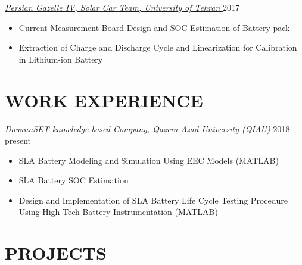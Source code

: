 \documentclass[10pt,a4paper,sans]{moderncv} %
\begin{document}
		\vspace{0.5em}
		
		\href{https://pgsc.ut.ac.ir/en/}{ \emph{Persian Gazelle IV, Solar Car Team, University of Tehran }} \hfill 2017
    	\begin{itemize}[nosep, leftmargin=0.9cm ]
    	    \item Current Measurement Board Design and SOC Estimation of Battery pack
    	    \item Extraction of Charge and Discharge Cycle and Linearization for Calibration in Lithium-ion Battery
    	\end{itemize}
	    
	\section{WORK EXPERIENCE}
	
		\href{http://dowranset.com/}{ \emph{DowranSET knowledge-based Company, Qazvin Azad University (QIAU)}} \hfill 2018-present
		
		\begin{itemize}[nosep, leftmargin=0.9cm ]
    	    \item SLA Battery Modeling and Simulation Using EEC Models (MATLAB) %
    	    \item SLA Battery SOC Estimation 
    	    \item Design and Implementation of SLA Battery Life Cycle Testing Procedure Using High-Tech Battery Instrumentation (MATLAB)
		\end{itemize}
		
	\vspace{-1em}	
	
	\section{PROJECTS}
	
\end{document}

